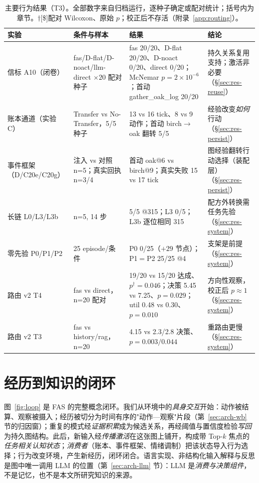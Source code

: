 \documentclass[10pt,a4paper]{ctexart}
\begin{document}
\begin{table}[t]
\centering\small
\caption{主要行为结果（T3）。全部数字来自归档运行，逐种子确定或配对统计；括号内为章节。$\dagger$[\$]配对 Wilcoxon、原始 $p$；校正后不存活（附录~\ref{app:routing}）。}
\label{tab:behavior}
\begin{tabular}{L{3.6cm}L{5.2cm}L{3.6cm}L{2.4cm}}
\toprule
\textbf{实验} & \textbf{条件与样本} & \textbf{结果} & \textbf{结论} \\
\midrule
信标 A10（闭卷） & fas/D-flat/D-noact/llm-direct $\times 20$ 配对种子 & fas 20/20、D-flat 20/20、D-noact 0/20、direct 0/20；McNemar $p{=}2\times10^{-6}$；首动 gather\_oak\_log 20/20 & 持久关系复用支持；激活非必要（\S\ref{sec:res-reuse}） \\
账本通道（实验 C） & Transfer vs No-Transfer，5/5 种子 & 13 vs 16 tick、8 vs 9 动作；首动 birch$\rightarrow$oak 翻转 5/5 & 经验改变\emph{如何}行动（\S\ref{sec:res-persist}） \\
事件框架（D/C20e/C20g） & 注入 vs 对照 n=5；真实回执 n=3/4 & 首动 oak@6 vs birch@9；真实失败 15 vs 17 tick & 图经验翻转行动选择（装配层）（\S\ref{sec:res-persist}） \\
长链 L0/L3/L3b & n=5, 14 步 & 5/5 @315；L3 0/5；L3b 逐位相同 315 & 配方外转换需任务先验（\S\ref{sec:res-system}） \\
零先验 P0/P1/P2 & 25 episode/条件 & P0 0/25（$+29$ 节点）；P1$=$P2 25/25 @4 & 支架是前提（\S\ref{sec:res-system}） \\
路由 v2 T4 & fas vs direct，n=20 配对 & 19/20 vs 15/20 达成、$p^{\dagger}{=}0.046$；决策 5.45 vs 7.25、$p{=}0.029$；util 0.48 vs 0.30、$p{=}0.010$ & 方向性观察，校正后 $p{\approx}1$（\S\ref{sec:res-system}） \\
路由 v2 T3 & fas vs history/rag，n=20 & 4.15 vs 2.3/2.8 决策、$p{=}0.003/0.044$ & 重路由更慢（\S\ref{sec:res-system}） \\
\bottomrule
\end{tabular}
\end{table}

\section{经历到知识的闭环}
\label{sec:loop}

图~\ref{fig:loop} 是 FAS 的完整概念闭环。我们从环境中的\emph{具身交互}开始：动作被结算、观察被摄入；经历被切分为时间有序的"动作—观察"片段（第~\ref{sec:arch-wb} 节的归因窗）；重复的模式经\emph{证据积累}成为候选关系，再经阈值与置信度检验\emph{写回}为持久图结构。此后，新输入经\emph{传播激活}在这张图上铺开，构成带 Top-$k$ 焦点的\emph{任务相关认知状态}；\emph{消费者}（账本、事件框架、情绪调制）把该状态导入行为选择；行为改变环境，产生新经历，闭环闭合。语言实现、非结构化输入解释与反思是图中唯一调用 LLM 的位置（第~\ref{sec:arch-llm} 节）：LLM 是\emph{消费与决策组件}，不是记忆，也不是本文所研究知识的来源。
\end{document}
